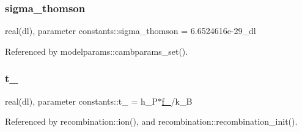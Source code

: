 \subsubsection{\texorpdfstring{sigma\+\_\+thomson}{sigma\_thomson}}
{\footnotesize\ttfamily real(dl), parameter constants\+::sigma\+\_\+thomson = 6.\+6524616e-\/29\+\_\+dl}



Referenced by modelparams\+::cambparams\+\_\+set().

\mbox{\label{namespaceconstants_aa56ede3c3cc5685250653e6c0df5f5c9}} 
\subsubsection{\texorpdfstring{t\+\_\+21cm}{t\_21cm}}
{\footnotesize\ttfamily real(dl), parameter constants\+::t\+\_\+21cm = h\+\_\+P$\ast$\mbox{\hyperlink{namespaceconstants_aacc448f4915bb510b8d82376e8bd6963}{f\+\_\+21cm}}/k\+\_\+B}



Referenced by recombination\+::ion(), and recombination\+::recombination\+\_\+init().

